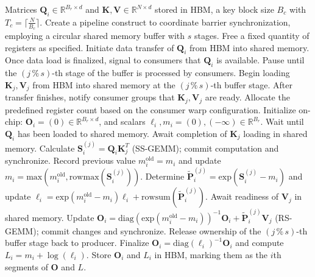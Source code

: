\begin{enumerate}
\begin{algorithm}[H]
    \caption{\small\label{alg:flash3_wgmma_ws_only}\textsc{FlashAttention-3} forward pass \textbf{excluding} intra-consumer overlapping -- CTA perspective}
    \begin{algorithmic}[1]
\REQUIRE Matrices $\mathbf{Q}_i \in \mathbb{R}^{B_r \times d}$ and $\mathbf{K}, \mathbf{V} \in \mathbb{R}^{N \times d}$ stored in HBM, a key block size $B_c$ with $T_c = \lceil \frac{N}{B_c} \rceil$.
\STATE Create a pipeline construct to coordinate barrier synchronization, employing a circular shared memory buffer with $s$ stages.
\STATE Free a fixed quantity of registers as specified.
\STATE Initiate data transfer of $\mathbf{Q}_i$ from HBM into shared memory.
\STATE Once data load is finalized, signal to consumers that $\mathbf{Q}_i$ is available.
    \STATE Pause until the $(j\,\%\,s)$-th stage of the buffer is processed by consumers.
    \STATE Begin loading $\mathbf{K}_j, \mathbf{V}_j$ from HBM into shared memory at the $(j\,\%\,s)$-th buffer stage.
    \STATE After transfer finishes, notify consumer groups that $\mathbf{K}_j, \mathbf{V}_j$ are ready.
\ENDFOR
\ELSE \STATE Allocate the predefined register count based on the consumer warp configuration.
\STATE Initialize on-chip: $\mathbf{O}_i = (0) \in \mathbb{R}^{B_r \times d}$, and scalars $\ell_i, m_i = (0), (-\infty) \in \mathbb{R}^{B_r}$.
\STATE Wait until $\mathbf{Q}_i$ has been loaded to shared memory.
\STATE Await completion of $\mathbf{K}_j$ loading in shared memory.
\STATE Calculate $\mathbf{S}_i^{(j)} = \mathbf{Q}_i \mathbf{K}_j^T$ (SS-GEMM); commit computation and synchronize. \label{alg:ws_only_gemm1}
\STATE Record previous value $m_i^{\mathrm{old}} = m_i$ and update $m_i = \mathrm{max}(m_i^{\mathrm{old}}, \mathrm{rowmax}(\mathbf{S}_i^{(j)}))$. \label{code-ws:softmax_start}
\STATE Determine $\widetilde{\mathbf{P}}_i^{(j)} = \mathrm{exp}(\mathbf{S}_i^{(j)} - m_i)$ and update $\ell_i = \mathrm{exp}(m_i^{\mathrm{old}} - m_i) \ell_i + \mathrm{rowsum}(\widetilde{\mathbf{P}}_i^{(j)})$. \label{code-ws:softmax_end}
\STATE Await readiness of $\mathbf{V}_j$ in shared memory.
\STATE Update $\mathbf{O}_i = \mathrm{diag}(\mathrm{exp}(m_i^{\mathrm{old}} - m_i))^{-1} \mathbf{O}_i + \widetilde{\mathbf{P}}_i^{(j)} \mathbf{V}_j$ (RS-GEMM); commit changes and synchronize. \label{alg:ws_only_gemm2}
\STATE Release ownership of the $(j\,\%\,s)$-th buffer stage back to producer.
\ENDFOR
\STATE Finalize $\mathbf{O}_i = \mathrm{diag}(\ell_i)^{-1} \mathbf{O}_i$ and compute $L_i = m_i + \log(\ell_i)$.
\STATE Store $\mathbf{O}_i$ and $L_i$ in HBM, marking them as the $i$th segments of $\mathbf{O}$ and $L$.
\ENDIF
\end{algorithmic}
\end{algorithm}


\end{enumerate}
